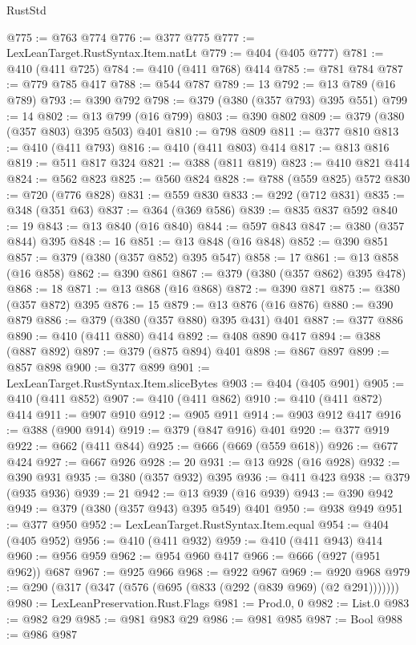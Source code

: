 \begin{lexlean}{RustStd}
\begin{coremodule}
@775 := @763 @774
@776 := @377 @775
@777 := LexLeanTarget.RustSyntax.Item.natLt
@779 := @404 (@405 @777)
@781 := @410 (@411 @725)
@784 := @410 (@411 @768) @414
@785 := @781 @784
@787 := @779 @785 @417
@788 := @544 @787
@789 := 13
@792 := @13 @789 (@16 @789)
@793 := @390 @792
@798 := @379 (@380 (@357 @793) @395 @551)
@799 := 14
@802 := @13 @799 (@16 @799)
@803 := @390 @802
@809 := @379 (@380 (@357 @803) @395 @503) @401
@810 := @798 @809
@811 := @377 @810
@813 := @410 (@411 @793)
@816 := @410 (@411 @803) @414
@817 := @813 @816
@819 := @511 @817 @324
@821 := @388 (@811 @819)
@823 := @410 @821 @414
@824 := @562 @823
@825 := @560 @824
@828 := @788 (@559 @825) @572
@830 := @720 (@776 @828)
@831 := @559 @830
@833 := @292 (@712 @831)
@835 := @348 (@351 @63)
@837 := @364 (@369 @586)
@839 := @835 @837 @592
@840 := 19
@843 := @13 @840 (@16 @840)
@844 := @597 @843
@847 := @380 (@357 @844) @395
@848 := 16
@851 := @13 @848 (@16 @848)
@852 := @390 @851
@857 := @379 (@380 (@357 @852) @395 @547)
@858 := 17
@861 := @13 @858 (@16 @858)
@862 := @390 @861
@867 := @379 (@380 (@357 @862) @395 @478)
@868 := 18
@871 := @13 @868 (@16 @868)
@872 := @390 @871
@875 := @380 (@357 @872) @395
@876 := 15
@879 := @13 @876 (@16 @876)
@880 := @390 @879
@886 := @379 (@380 (@357 @880) @395 @431) @401
@887 := @377 @886
@890 := @410 (@411 @880) @414
@892 := @408 @890 @417
@894 := @388 (@887 @892)
@897 := @379 (@875 @894) @401
@898 := @867 @897
@899 := @857 @898
@900 := @377 @899
@901 := LexLeanTarget.RustSyntax.Item.sliceBytes
@903 := @404 (@405 @901)
@905 := @410 (@411 @852)
@907 := @410 (@411 @862)
@910 := @410 (@411 @872) @414
@911 := @907 @910
@912 := @905 @911
@914 := @903 @912 @417
@916 := @388 (@900 @914)
@919 := @379 (@847 @916) @401
@920 := @377 @919
@922 := @662 (@411 @844)
@925 := @666 (@669 (@559 @618))
@926 := @677 @424
@927 := @667 @926
@928 := 20
@931 := @13 @928 (@16 @928)
@932 := @390 @931
@935 := @380 (@357 @932) @395
@936 := @411 @423
@938 := @379 (@935 @936)
@939 := 21
@942 := @13 @939 (@16 @939)
@943 := @390 @942
@949 := @379 (@380 (@357 @943) @395 @549) @401
@950 := @938 @949
@951 := @377 @950
@952 := LexLeanTarget.RustSyntax.Item.equal
@954 := @404 (@405 @952)
@956 := @410 (@411 @932)
@959 := @410 (@411 @943) @414
@960 := @956 @959
@962 := @954 @960 @417
@966 := @666 (@927 (@951 @962)) @687
@967 := @925 @966
@968 := @922 @967
@969 := @920 @968
@979 := @290 (@317 (@347 (@576 (@695 (@833 (@292 (@839 @969) (@2 @291)))))))
@980 := LexLeanPreservation.Rust.Flags
@981 := Prod.{0, 0}
@982 := List.{0}
@983 := @982 @29
@985 := @981 @983 @29
@986 := @981 @985
@987 := Bool
@988 := @986 @987

\end{coremodule}
\end{lexlean}
